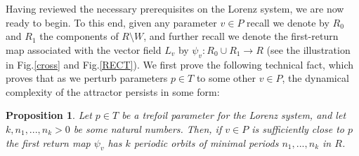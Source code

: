 \documentclass[10pt,reqno]{amsart}
\theoremstyle{plain}
\theoremstyle{assumption}
\theoremstyle{notation}
\theoremstyle{claim}
\theoremstyle{conj}
\theoremstyle{theorem}
\theoremstyle{proposition}
\newtheorem{proposition}{Proposition}[section]
\theoremstyle{corollary}
\begin{document}
Having reviewed the necessary prerequisites on the Lorenz system, we are now ready to begin. To this end, given any parameter $v\in P$ recall we denote by $R_{0}$ and $R_{1}$ the components of $R\setminus W$, and further recall we denote the first-return map associated with the vector field $L_v$ by $\psi_v:R_{0}\cup R_{1}\to R$ (see the illustration in Fig.\ref{cross} and Fig.\ref{RECT}). We first prove the following technical fact, which proves that as we perturb parameters $p\in T$ to some other $v\in P$, the dynamical complexity of the attractor persists in some form:
\begin{proposition}
    \label{persistence}
    Let $p\in T$ be a trefoil parameter for the Lorenz system, and let $k,n_1,...,n_k>0$ be some natural numbers. Then, if $v\in P$ is sufficiently close to $p$ the first return map $\psi_v$ has $k$ periodic orbits of minimal periods $n_1,...,n_k$ in $R$.
\end{proposition}
\end{document}

